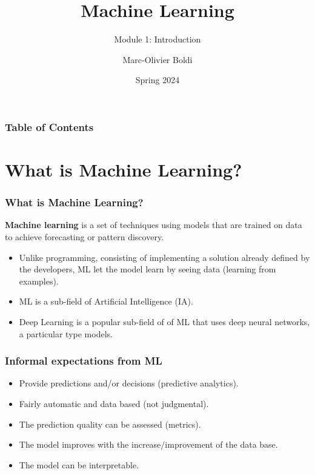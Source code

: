 
\title{Machine Learning}
\subtitle{Module 1: Introduction}
\author[MOB]{Marc-Olivier Boldi}
\date{Spring 2024}

\begin{frame}
	\titlepage
\end{frame}
\begin{frame}
\frametitle{Table of Contents}
	\tableofcontents
\end{frame}
\section{What is Machine Learning?}
\begin{frame}
\frametitle{What is Machine Learning?}
{\bf Machine learning} is a set of techniques using models that are trained on data to achieve forecasting or pattern discovery. 

\begin{itemize}
\item Unlike programming, consisting of implementing a solution already defined by the developers, ML let the model learn by seeing data (learning from examples). 
\item ML is a sub-field of Artificial Intelligence (IA).
\item Deep Learning is a popular sub-field of of ML that uses deep neural networks, a particular type models.
\end{itemize}
\end{frame}
\begin{frame}
\frametitle{Informal expectations from ML}
\begin{itemize}
\item Provide predictions and/or decisions (predictive analytics).
\item Fairly automatic and data based (not judgmental).
\item The prediction quality can be assessed (metrics).
\item The model improves with the increase/improvement of the data base.
\item The model can be interpretable.
\end{itemize}
\end{frame}
